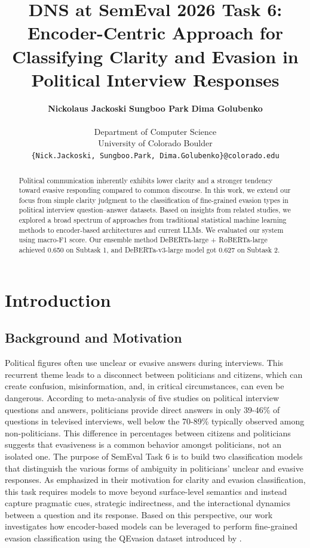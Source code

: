 \documentclass[11pt]{article}
\title{DNS at SemEval 2026 Task 6: Encoder-Centric Approach for Classifying Clarity and Evasion in Political Interview Responses}
\author{
\begin{tabular}{c}
    \textbf{Nickolaus Jackoski} \quad
    \textbf{Sungboo Park} \quad
    \textbf{Dima Golubenko}
\end{tabular} \\
Department of Computer Science \\
University of Colorado Boulder \\
\texttt{\{Nick.Jackoski, Sungboo.Park, Dima.Golubenko\}@colorado.edu}
}
\begin{document}
\maketitle
\begin{abstract}
Political communication inherently exhibits lower clarity and a stronger tendency toward evasive responding compared to common discourse. In this work, we extend our focus from simple clarity judgment to the classification of fine-grained evasion types in political interview question–answer datasets. Based on insights from related studies, we explored a broad spectrum of approaches from traditional statistical machine learning methods to encoder-based architectures and current LLMs. We evaluated our system using macro-F1 score. Our ensemble method DeBERTa-large + RoBERTa-large achieved 0.650 on Subtask 1, and DeBERTa-v3-large model got 0.627 on Subtask 2.
\end{abstract}

\section{Introduction}

\subsection{Background and Motivation}

Political figures often use unclear or evasive answers during interviews. This recurrent theme leads to a disconnect between politicians and citizens, which can create confusion, misinformation, and, in critical circumstances, can even be dangerous. According to \citet{bull2003microanalysis} meta-analysis of five studies on political interview questions and answers, politicians provide direct answers in only 39-46\% of questions in televised interviews, well below the 70-89\% typically observed among non-politicians. This difference in percentages between citizens and politicians suggests that evasiveness is a common behavior amongst politicians, not an isolated one. The purpose of SemEval Task 6 is to build two classification models that distinguish the various forms of ambiguity in politicians' unclear and evasive responses. As emphasized in their motivation for clarity and evasion classification, this task requires models to move beyond surface-level semantics and instead capture pragmatic cues, strategic indirectness, and the interactional dynamics between a question and its response. Based on this perspective, our work investigates how encoder-based models can be leveraged to perform fine-grained evasion classification using the QEvasion dataset introduced by \citet{thomas2024isaidthatdataset}.
\end{document}
